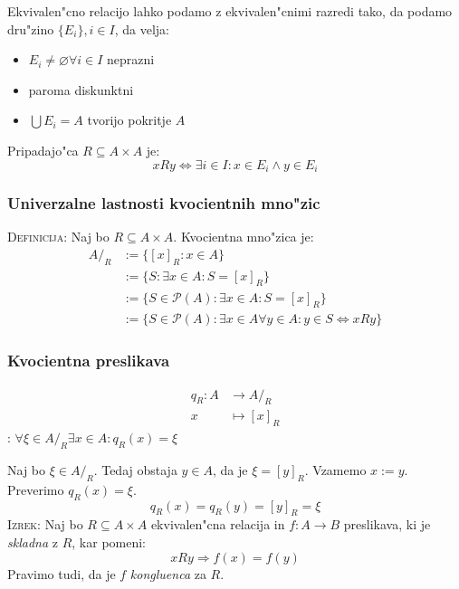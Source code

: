 Ekvivalen"cno relacijo lahko podamo z ekvivalen"cnimi razredi tako, da podamo dru"zino $\{E_i\}, i \in I$, da velja:
\begin{itemize}
	\item $E_i \neq \varnothing \forall i \in I$ neprazni
	\item paroma diskunktni
	\item $\bigcup E_i = A$ tvorijo pokritje $A$
\end{itemize}
Pripadajo"ca $R \subseteq A \times A$ je:
\begin{equation*}
x R y \iff \exists i \in I: x \in E_i \land y \in E_i
\end{equation*}
%
\subsubsection{Univerzalne lastnosti kvocientnih mno"zic}
\textsc{Definicija:} Naj bo $R \subseteq A \times A$. Kvocientna mno"zica je:
\begin{align*}
A/_R &:= \{[x]_R : x \in A\} \\
&:= \{S: \exists x \in A: S = [x]_R\} \\
&:= \{S \in \mathcal{P}(A):\exists x \in A: S = [x]_R\} \\
&:= \{S \in \mathcal{P}(A):\exists x \in A \forall y \in A: y \in S \iff x R y \}
\end{align*}
\subsubsection*{Kvocientna preslikava}
\begin{align*}
q_R : A &\to A/_R \\
x &\mapsto  [x]_R
\end{align*}
: $\forall \xi \in A/_R \exists x \in A: q_R(x) = \xi$

Naj bo $\xi \in A/_R$. Tedaj obstaja $y \in A$, da je $\xi = [y]_R$. Vzamemo $x := y$. Preverimo $q_R(x) = \xi$.
\begin{equation*}
q_R(x) = q_R(y) = [y]_R = \xi
\end{equation*}
\textsc{Izrek:} Naj bo $R \subseteq A \times A$ ekvivalen"cna relacija in $f: A \to B$ preslikava, ki je \emph{skladna} z $R$, kar pomeni:
\begin{equation*}
x R y \Rightarrow f(x) = f(y)
\end{equation*}
Pravimo tudi, da je $f$ \emph{kongluenca} za $R$.

